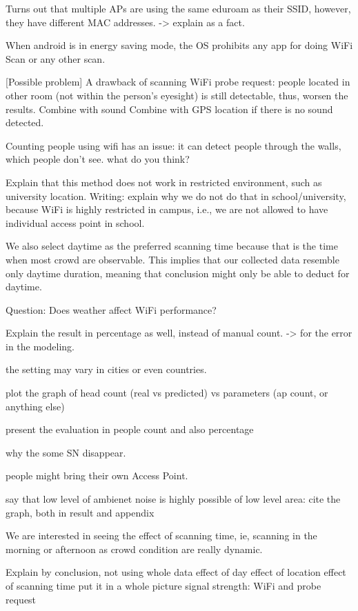 Turns out that multiple APs are using the same eduroam as their SSID, however, they have different MAC addresses. -> explain as a fact.

When android is in energy saving mode, the OS prohibits any app for doing WiFi Scan or any other scan.

[Possible problem] A drawback of scanning WiFi probe request: people located in other room (not within the person's eyesight) is still detectable, thus, worsen the results.
Combine with sound
Combine with GPS location if there is no sound detected.

Counting people using wifi has an issue: it can detect people through the walls, which people don't see. what do you think?

Explain that this method does not work in restricted environment, such as university location. Writing: explain why we do not do that in school/university, because WiFi is highly restricted in campus, i.e., we are not allowed to have individual access point in school.

We also select daytime as the preferred scanning time because that is the time when most crowd are observable. This implies that our collected data resemble only daytime duration, meaning that conclusion might only be able to deduct for daytime.


Question: Does weather affect WiFi performance?

Explain the result in percentage as well, instead of manual count. -> for the error in the modeling.

the setting may vary in cities or even countries.

plot the graph of head count (real vs predicted) vs parameters (ap count, or anything else)

present the evaluation in people count and also percentage

why the some SN disappear.

people might bring their own Access Point.

say that low level of ambienet noise is highly possible of low level area: cite the graph, both in result and appendix

We are interested in seeing the effect of scanning time, ie, scanning in the morning or afternoon as crowd condition are really dynamic.

Explain by conclusion, not using whole data
effect of day
effect of location
effect of scanning time
put it in a whole picture
signal strength: WiFi and probe request

